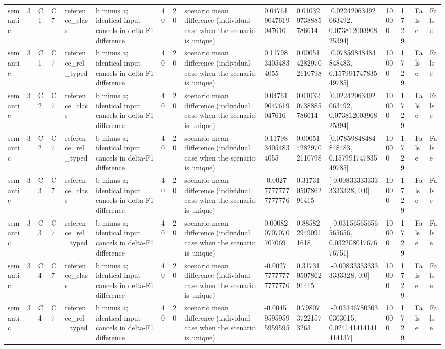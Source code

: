 \begin{tabular}{llllllllllllllll}
semantic & 3 & C1 & C7 & reference\_class & b minus a; identical input cancels in delta-F1 difference & 40 & 20 & scenario mean difference (individual case when the scenario is unique) & 0.047619047619047616 & 0.010320738885786614 & [0.02242063492063492, 0.07381200396825394] & 10000 & 1729 & False & False \\
semantic & 3 & C1 & C7 & reference\_rel\_typed & b minus a; identical input cancels in delta-F1 difference & 40 & 20 & scenario mean difference (individual case when the scenario is unique) & 0.1179834054834055 & 0.0005142829702110798 & [0.07859848484848483, 0.15799174783549785] & 10000 & 1729 & False & False \\
semantic & 3 & C2 & C7 & reference\_class & b minus a; identical input cancels in delta-F1 difference & 40 & 20 & scenario mean difference (individual case when the scenario is unique) & 0.047619047619047616 & 0.010320738885786614 & [0.02242063492063492, 0.07381200396825394] & 10000 & 1729 & False & False \\
semantic & 3 & C2 & C7 & reference\_rel\_typed & b minus a; identical input cancels in delta-F1 difference & 40 & 20 & scenario mean difference (individual case when the scenario is unique) & 0.1179834054834055 & 0.0005142829702110798 & [0.07859848484848483, 0.15799174783549785] & 10000 & 1729 & False & False \\
semantic & 3 & C3 & C7 & reference\_class & b minus a; identical input cancels in delta-F1 difference & 40 & 20 & scenario mean difference (individual case when the scenario is unique) & -0.002777777777777776 & 0.31731050786291415 & [-0.008333333333333328, 0.0] & 10000 & 1729 & False & False \\
semantic & 3 & C3 & C7 & reference\_rel\_typed & b minus a; identical input cancels in delta-F1 difference & 40 & 20 & scenario mean difference (individual case when the scenario is unique) & 0.000820707070707069 & 0.8858229490911618 & [-0.03156565656565656, 0.03220801767676751] & 10000 & 1729 & False & False \\
semantic & 3 & C4 & C7 & reference\_class & b minus a; identical input cancels in delta-F1 difference & 40 & 20 & scenario mean difference (individual case when the scenario is unique) & -0.002777777777777776 & 0.31731050786291415 & [-0.008333333333333328, 0.0] & 10000 & 1729 & False & False \\
semantic & 3 & C4 & C7 & reference\_rel\_typed & b minus a; identical input cancels in delta-F1 difference & 40 & 20 & scenario mean difference (individual case when the scenario is unique) & -0.004595959595959595 & 0.7980737221573263 & [-0.034467803030303015, 0.024141414141414137] & 10000 & 1729 & False & False \\

\end{tabular}
